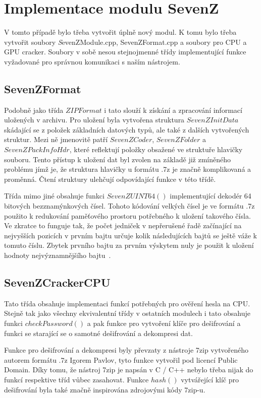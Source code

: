 \section{Implementace modulu SevenZ}
V tomto případě bylo třeba vytvořit úplně nový modul. K tomu bylo třeba vytvořit soubory {\textit
SevenZModule.cpp, SevenZFormat.cpp} a soubory pro CPU a GPU cracker. Soubory v sobě nesou
stejnojmenné třídy implementující funkce vyžadované pro správnou komunikaci s naším nástrojem.

\subsection{SevenZFormat}
Podobně jako třída $ZIPFormat$ i tato slouží k získání a zpracování informací uložených v
archivu. Pro uložení byla vytvořena struktura $SevenZInitData$ skádající se z položek základních
datových typů, ale také z dalších vytvořených struktur. Mezi ně jmenovitě patří $SevenZCoder$,
$SevenZFolder$ a $SevenZPackInfoHdr$, které reflektují položky obsažené ve struktuře hlavičky
souboru. Tento přístup k uložení dat byl zvolen na základě již zmíněného problému jímž je, že
struktura hlavičky u formátu .7z je značně komplikovaná a proměnná. Čtení struktury ulehčují
odpovídající funkce v této třídě.

 Třída mimo jiné obsahuje funkci $SevenZUINT64()$ implementující dekodér 64 bitových
bezznamýnkových čísel. Tohoto kódování velkých čísel je ve formátu .7z použito k redukování
paměťového prostoru potřebného k uložení takového čísla. Ve zkratce to funguje tak, že počet
jedniček v nepřerušené řadě začínající na nejvyšších pozicích v prvním bajtu určuje kolik
následujících bajtů se ještě váže k tomuto číslu. Zbytek prvního bajtu za prvním výskytem nuly je
použit k uložení hodnoty nejvýznamnějšího bajtu~\cite{Pavlov:2010}. 

\subsection{SevenZCrackerCPU}
\label{ssec:7zcrackercpu}
Tato třída obsahuje implementaci funkcí potřebných pro ověření hesla na CPU. Stejně tak jako
všechny ekvivalentní třídy v ostatních modulech i tato obsahuje funkci $checkPassword()$ a pak
funkce pro vytvoření klíče pro dešifrování a funkci se starající se o samotné dešifrování a
dekompresi dat.

 Funkce pro dešifrování a dekompresi byly převzaty z nástroje 7zip vytvořeného autorem formátu .7z
Igorem Pavlov, tyto funkce vytvořil pod licencí Public Domain. Díky tomu, že nástroj 7zip je
napsán v C / C++ nebylo třeba nijak do funkcí respektive tříd vůbec zasahovat. Funkce $hash()$
vytvářející klíč pro dešifrování byla také značně inspirována zdrojovými kódy 7zip-u. 

